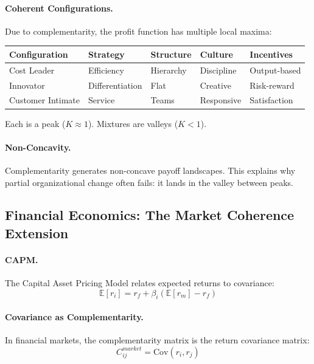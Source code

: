 \documentclass[12pt,a4paper]{article}
\begin{document}
\paragraph{Coherent Configurations.}
Due to complementarity, the profit function has multiple local maxima:
\begin{center}
\renewcommand{\arraystretch}{1.2}
\begin{tabular}{lllll}
\hline
\textbf{Configuration} & \textbf{Strategy} & \textbf{Structure} & \textbf{Culture} & \textbf{Incentives} \\
\hline
Cost Leader & Efficiency & Hierarchy & Discipline & Output-based \\
Innovator & Differentiation & Flat & Creative & Risk-reward \\
Customer Intimate & Service & Teams & Responsive & Satisfaction \\
\hline
\end{tabular}
\end{center}

Each is a peak ($K \approx 1$). Mixtures are valleys ($K < 1$).

\paragraph{Non-Concavity.}
Complementarity generates non-concave payoff landscapes.
This explains why partial organizational change often fails:
it lands in the valley between peaks.

\subsection{Financial Economics: The Market Coherence Extension}

\paragraph{CAPM.}
The Capital Asset Pricing Model relates expected returns to covariance:
\begin{equation}
  \mathbb{E}[r_i] = r_f + \beta_i (\mathbb{E}[r_m] - r_f)
\end{equation}

\paragraph{Covariance as Complementarity.}
In financial markets, the complementarity matrix is the return covariance matrix:
\begin{equation}
  C^{market}_{ij} = \text{Cov}(r_i, r_j)
\end{equation}
\end{document}

